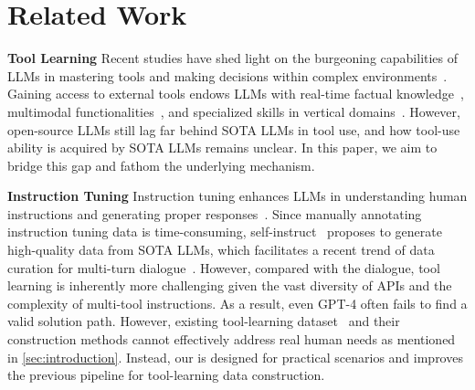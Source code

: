 \section{Related Work}
\textbf{Tool Learning} \quad
Recent studies have shed light on the burgeoning capabilities of LLMs in mastering tools and making decisions within complex environments~\citep{vemprala2023chatgpt,nakano2021webgpt,qin2023webcpm,shen2023hugginggpt,wu2023visual,schick2023toolformer,hao2023toolkengpt,qian2023creator,song2023restgpt,zhuang2023toolqa,gao2023assistgpt}.
Gaining access to external tools endows LLMs with real-time factual knowledge~\citep{yang2023chatgpt}, multimodal functionalities~\citep{gupta2023visual}, and specialized skills in vertical domains~\citep{jin2023genegpt}. However, open-source LLMs still lag far behind SOTA LLMs in tool use, and how tool-use ability is acquired by SOTA LLMs remains unclear. In this paper, we aim to bridge this gap and fathom the underlying mechanism.

\textbf{Instruction Tuning} \quad
Instruction tuning enhances LLMs in understanding human instructions and generating proper responses~\citep{wei2021finetuned,bach2022promptsource,mishra2022cross}. Since manually annotating instruction tuning data is time-consuming, self-instruct~\citep{wang2022self} proposes to generate high-quality data from SOTA LLMs, which facilitates a recent trend of data curation for multi-turn dialogue~\citep{alpaca,vicuna2023,xu2023wizardlm,penedo2023refinedweb,ding2023enhancing}. However, compared with the dialogue, tool learning is inherently more challenging given the vast diversity of APIs and the complexity of multi-tool instructions. As a result, even GPT-4 often fails to find a valid solution path. However, existing tool-learning dataset~\citep{li2023api,patil2023gorilla,tang2023toolalpaca,xu2023tool} and their construction methods cannot effectively address real human needs as mentioned in \cref{sec:introduction}. Instead, our \ourdata is designed for practical scenarios and improves the previous pipeline for tool-learning data construction. %

